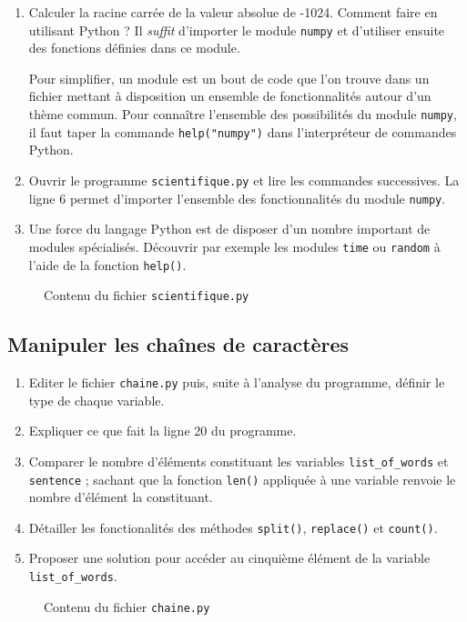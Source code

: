 \begin{enumerate}
\item Calculer la racine carrée de la valeur absolue de -1024.
  Comment faire en utilisant Python ?
  Il \textit{suffit} d'importer le module \texttt{numpy} et d'utiliser ensuite
  des fonctions définies dans ce module.
  
  Pour simplifier, un module est un bout de code que l'on trouve dans un fichier
  mettant à disposition un ensemble de fonctionnalités autour d'un thème commun.
  Pour connaître l'ensemble des possibilités du module \texttt{numpy}, il faut taper la commande
  \texttt{help("numpy")} dans l'interpréteur de commandes Python.

\item Ouvrir le programme \texttt{scientifique.py} et lire les commandes successives.
  La ligne 6 permet d'importer l'ensemble des fonctionnalités du module \texttt{numpy}.

\item Une force du langage Python est de disposer d'un nombre important de modules spécialisés.
  Découvrir par exemple les modules \texttt{time} ou \texttt{random} à l'aide de la fonction \texttt{help()}.
\end{enumerate}


\begin{figure}  
  
  \caption{Contenu du fichier \texttt{scientifique.py}}
  \label{polynome_scientifique}
\end{figure}


\subsection{Manipuler les chaînes de caractères}


\begin{enumerate}

\item Editer le  fichier \texttt{chaine.py} puis,
  suite à l'analyse du programme, définir le type de chaque variable.

\item Expliquer ce que fait la ligne 20 du programme.

\item Comparer le nombre d'éléments constituant les variables
  \texttt{list\_of\_words} et  \texttt{sentence} ; sachant que la fonction \verb+len()+
  appliquée à une variable renvoie le nombre d'élément la constituant.
  
\item Détailler les fonctionalités des méthodes \texttt{split()}, \texttt{replace()} et \texttt{count()}.

\item Proposer une solution pour accéder au cinquième élément de la variable \texttt{list\_of\_words}.

\end{enumerate}


\begin{figure}  
  
  \caption{Contenu du fichier \texttt{chaine.py}}
  \label{polynome_chaine}
\end{figure}
